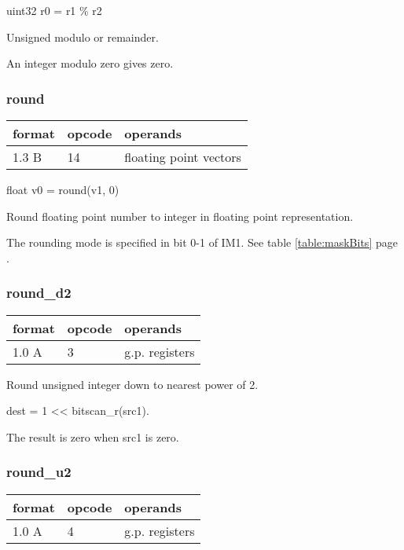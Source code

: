 \documentclass[forwardcom.tex]{subfiles}
\begin{document}
uint32 r0 = r1 \% r2
\vspace{2mm}

Unsigned modulo or remainder.

\vspace{2mm}
An integer modulo zero gives zero.


\subsubsection{round}
\label{table:roundInstruction}
\begin{tabular}{|p{12mm}|p{12mm}|p{110mm}|}
\hline
\bfseries format & \bfseries opcode & \bfseries operands \\ \hline
1.3 B & 14 & floating point vectors \\ \hline
\end{tabular}
\vspace{2mm}

float v0 = round(v1, 0)
\vspace{2mm}

Round floating point number to integer in floating point representation.
\vspace{2mm}

The rounding mode is specified in bit 0-1 of IM1. See table \ref{table:maskBits} page \pageref{table:maskBits}.

\subsubsection{round\_d2}
\label{table:roundD2Instruction}
\begin{tabular}{|p{12mm}|p{12mm}|p{110mm}|}
\hline
\bfseries format & \bfseries opcode & \bfseries operands \\ \hline
1.0 A &  3 & g.p. registers \\ \hline
\end{tabular}
\vspace{2mm}

Round unsigned integer down to nearest power of 2.

dest = 1 \textless\textless{} bitscan\_r(src1).
\vspace{2mm}

The result is zero when src1 is zero.

\subsubsection{round\_u2}
\label{table:roundU2Instruction}
\begin{tabular}{|p{12mm}|p{12mm}|p{110mm}|}
\hline
\bfseries format & \bfseries opcode & \bfseries operands \\ \hline
1.0 A &  4 & g.p. registers \\ \hline
\end{tabular}
\vspace{2mm}
\end{document}
